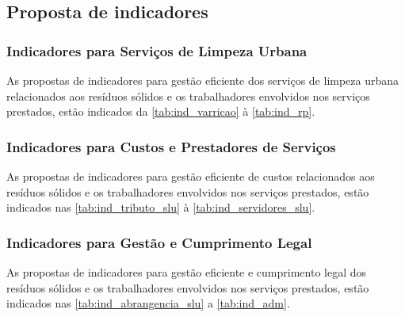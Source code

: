 	\subsection{Proposta de indicadores}
	\subsubsection{Indicadores para Serviços de Limpeza Urbana }
	As propostas de indicadores para gestão eficiente dos serviços de limpeza urbana relacionados aos resíduos sólidos e os trabalhadores envolvidos nos serviços prestados, estão indicados da \autoref{tab:ind_varricao} à \autoref{tab:ind_rp}.
	
	
	
	
	
	
	
	
	
	
	
	
	
	
	
	
	
	
	
	
	
	
	
	
	
	\subsubsection{Indicadores para Custos e Prestadores de Serviços}
	As propostas de indicadores para gestão eficiente de custos relacionados aos resíduos sólidos e os trabalhadores envolvidos nos serviços prestados, estão indicados nas \autoref{tab:ind_tributo_slu} à \autoref{tab:ind_servidores_slu}.
	
	
	
	
	
	
	
	\subsubsection{Indicadores para Gestão e Cumprimento Legal }
	As propostas de indicadores para gestão eficiente e cumprimento legal dos resíduos sólidos e os trabalhadores envolvidos nos serviços prestados, estão indicados nas \autoref{tab:ind_abrangencia_slu} a \autoref{tab:ind_adm}.
	
